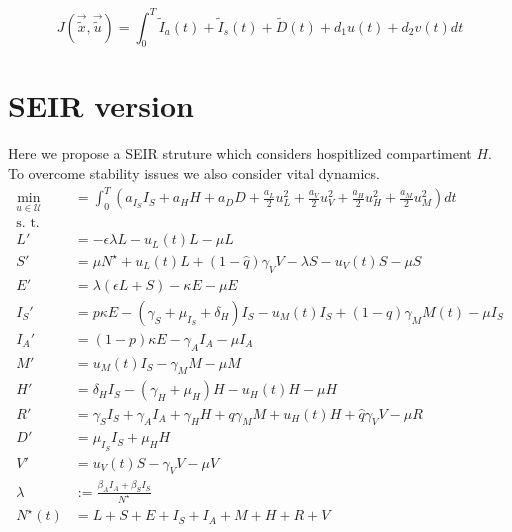 \documentclass[a4paper,10pt]{amsart}
\begin{document}
    \begin{equation}
        J(\vec{\tilde{x}}, \vec{\tilde{u}}) = 
        \int^T_0
            \tilde{I}_a(t) +
            \tilde{I}_s(t) +
            \tilde{D}(t) +
            d_1 u(t) + d_2v(t) 
        dt
    \end{equation}
    
    \section{SEIR version}
       Here we propose a SEIR struture which considers hospitlized 
    compartiment $ H $. To overcome stability issues we also consider 
    vital dynamics.
    \begin{equation}
        \label{eqn:vital_dynamics}
        \begin{aligned}
            \min_{u \in \mathcal{U}} &=
            \int_{0}^T
                \left(
                    a_{I_S} I_S
                    + a_{H} H
                    + a_{D} D
                    + 
                    \frac{a_{L}}{2}  u_L ^ 2
                    + 
                    \frac{a_{V}}{2} u_V ^ 2 
                    + 
                    \frac{a_{H}}{2} u_H ^ 2 
                    + 
                    \frac{a_{M}}{2} u_M ^ 2 
                \right)
                dt
            \\
            \text{s. t.}
            \\
            L' & = 
                -\epsilon \lambda L - u_L(t) L - \mu L
            \\
            S' & =
                \mu N^\star + u_L(t) L + (1 - \widehat{q}) \gamma_V V 
                - \lambda S - u_V(t) S - \mu S
            \\
            E' & =
                \lambda (\epsilon L + S) - \kappa E - \mu E
            \\
            I_S' & =
                p \kappa E - (\gamma_S + \mu_{I_S} + \delta_H) I_S 
                - u_M(t) I_S + (1 - q) \gamma_M M(t)
                - \mu I_S
            \\
            I_A' &=
                (1 - p) \kappa E - \gamma_A I_A - \mu I_A
            \\
            M' &=
                u_M(t) I_S - \gamma_M M - \mu M
            \\
            H' &=
                \delta_H I_S - (\gamma_H + \mu_H) H - u_H(t) H - \mu H
            \\
            R' & =
                \gamma_S I_S + \gamma_A I_A + \gamma_H H + q \gamma_M M
                + u_H(t) H + \widehat{q} \gamma_V V - \mu R
            \\
            D' &=
                \mu_{I_S} I_S + \mu_H H
            \\
            V' &=
                u_V(t) S  - \gamma_V  V  - \mu V
            \\
            \lambda &:=
                \frac{\beta_A I_A + \beta_S I_S}{N^{\star}}
            \\
            N^{\star}(t) &=
                L + S +E + I_S + I_A +
                M + H + R + V
        \end{aligned}
    \end{equation}
\end{document}
